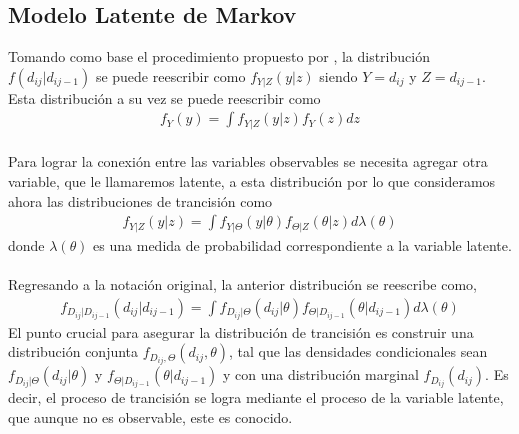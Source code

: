\subsection{Modelo Latente de Markov}
Tomando como base el procedimiento propuesto por \cite{pitt2002constructing}, la distribuci\'on $f(d_{ij}|d_{ij-1})$ se puede reescribir como $f_{Y|Z}(y|z)$ siendo $Y=d_{ij}$ y $Z=d_{ij-1}$. Esta distribuci\'on a su vez se puede reescribir como
\begin{align*}
f_Y(y)=\int f_{Y|Z}(y|z)f_Y(z)dz
\end{align*}
\\
Para lograr la conexi\'on entre las variables observables se necesita agregar otra variable, que le llamaremos latente, a esta distribuci\'on por lo que consideramos ahora las distribuciones de trancisi\'on como
\begin{align*}
f_{Y|Z}(y|z)=\int f_{Y|\Theta}(y|\theta)f_{\Theta|Z}(\theta|z)d\lambda(\theta)
\end{align*}
donde $\lambda(\theta)$ es una medida de probabilidad correspondiente a la variable latente.\\
\\
Regresando a la notaci\'on original, la anterior distribuci\'on se reescribe como,
\begin{align*}
f_{D_{ij}|D_{ij-1}}(d_{ij}|d_{ij-1})=\int f_{D_{ij}|\Theta}(d_{ij}|\theta)f_{\Theta|D_{ij-1}}(\theta|d_{ij-1})d\lambda(\theta)
\end{align*}
El punto crucial para asegurar la distribuci\'on de trancisi\'on es construir una distribuci\'on conjunta $f_{D_{ij},\Theta}(d_{ij},\theta)$, tal que las densidades condicionales sean $f_{D_{ij}|\Theta}(d_{ij}|\theta)$ y $f_{\Theta|D_{ij-1}}(\theta|d_{ij-1})$ y con una distribuci\'on marginal $f_{D_{ij}}(d_{ij})$. Es decir, el proceso de trancisi\'on se logra mediante el proceso de la variable latente, que aunque no es observable, este es conocido.
